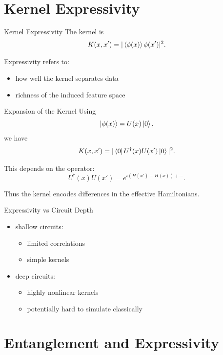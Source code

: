 \documentclass{beamer}
\begin{document}
\section{Kernel Expressivity}

\begin{frame}{Kernel Expressivity}
The kernel is
\[
K(x,x') = |\braket{\phi(x)}{\phi(x')}|^2.
\]

Expressivity refers to:
\begin{itemize}
\item how well the kernel separates data
\item richness of the induced feature space
\end{itemize}
\end{frame}


\begin{frame}{Expansion of the Kernel}
Using
\[
\ket{\phi(x)} = U(x)\ket{0},
\]
we have
\[
K(x,x') = |\bra{0} U^\dagger(x) U(x') \ket{0}|^2.
\]

This depends on the operator:
\[
U^\dagger(x)U(x') = e^{i(H(x') - H(x)) + \cdots}.
\]

Thus the kernel encodes differences in the effective Hamiltonians.
\end{frame}


\begin{frame}{Expressivity vs Circuit Depth}
\begin{itemize}
\item shallow circuits:
\begin{itemize}
\item limited correlations
\item simple kernels
\end{itemize}
\item deep circuits:
\begin{itemize}
\item highly nonlinear kernels
\item potentially hard to simulate classically
\end{itemize}
\end{itemize}
\end{frame}


\section{Entanglement and Expressivity}
\end{document}
